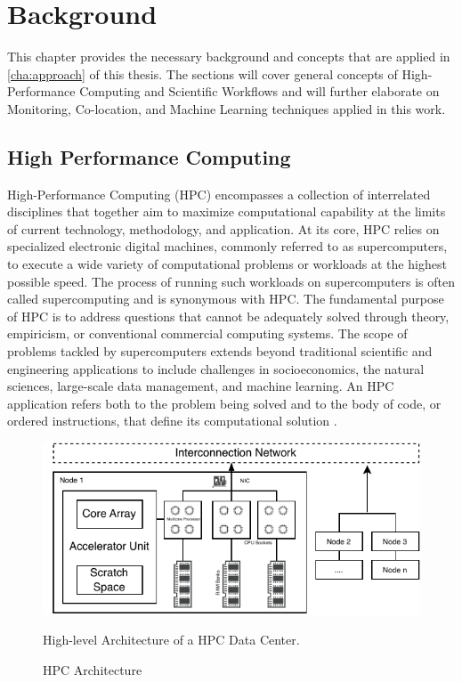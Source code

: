 \section{Background}
\label{cha:background}

This chapter provides the necessary background and concepts that are applied in \ref{cha:approach} of this thesis. The sections will cover general concepts of High-Performance Computing and Scientific Workflows and will further elaborate on Monitoring, Co-location, and Machine Learning techniques applied in this work.

\subsection{High Performance Computing}
\label{sec:background_hpc}
High-Performance Computing (HPC) encompasses a collection of interrelated disciplines that together aim to maximize computational capability at the limits of current technology, methodology, and application. At its core, HPC relies on specialized electronic digital machines, commonly referred to as supercomputers, to execute a wide variety of computational problems or workloads at the highest possible speed. The process of running such workloads on supercomputers is often called supercomputing and is synonymous with HPC. The fundamental purpose of HPC is to address questions that cannot be adequately solved through theory, empiricism, or conventional commercial computing systems. The scope of problems tackled by supercomputers extends beyond traditional scientific and engineering applications to include challenges in socioeconomics, the natural sciences, large-scale data management, and machine learning. An HPC application refers both to the problem being solved and to the body of code, or ordered instructions, that define its computational solution \cite{STERLING201843}.

\begin{figure}[H]
    \centering
    \includegraphics[scale=1.2]{fig/02/02-hpc-nodes.pdf}
    \small
    \caption{HPC Architecture}
    \label{fig:02-hpc-nodes}
    \tiny
    High-level Architecture of a HPC Data Center.
\end{figure}

